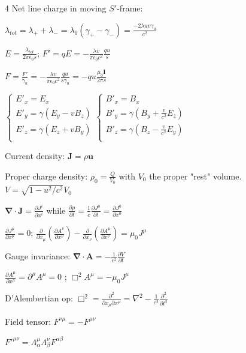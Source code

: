 \documentclass[a4paper,twoside]{article}
\begin{document}
\begin{multicols*}{4}
Net line charge in moving \(S'\)-frame:

\(\lambda_{tot} = \lambda_+ + \lambda_- = \lambda_0 (\gamma_+ - \gamma_-) = \frac{-2 \lambda uv\gamma_u}{c^2}\)

\(E = \frac{\lambda_{tot}}{2 \pi \epsilon_0 s}\);
\(F' = qE = - \frac{\lambda v}{\pi \epsilon_0 c^2} \frac{qu}{s}\)

\(F = \frac{F'}{\gamma_u} = - \frac{\lambda v}{\pi \epsilon_0 c^2} \frac{qu}{s \gamma_u} = -qu \frac{\mu_0 \bm I}{2 \pi s}\)



\(
\begin{cases}
    E'_x = E_x \\
    E'_y = \gamma (E_y - v B_z) \\
    E'_z = \gamma (E_z + v B_y) \\
\end{cases}
\begin{cases}
    B'_x = B_x \\
    B'_y = \gamma (B_y + \frac{v}{c^2} E_z) \\
    B'_z = \gamma (B_z - \frac{v}{c^2} E_y) \\
\end{cases}
\)

Current density:
\(\bm J = \rho \bm u\)

Proper charge density:
\(\rho_0 = \frac{Q}{V_0}\)
 with \(V_0\) the proper "rest" volume.
\(V = \sqrt{1 - u^2/c^2}V_0\)

\( \bm \nabla \cdot \bm J = \frac{\partial J^{i}}{\partial x^i} \) while \(\frac{\partial \rho}{\partial t} = \frac{1}{c} \frac{\partial J^0}{\partial t } = \frac{\partial J^0}{\partial x^0}\)

\(\frac{\partial J^\mu}{\partial x^\mu} = 0\);
\(\frac{\partial}{\partial x_\mu }(\frac{\partial A^\nu}{\partial x^\nu})-\frac{\partial}{\partial x_\nu }(\frac{\partial A^\mu}{\partial x^\nu}) = \mu_0 J^\mu\)

Gauge invariance:
\(\bm \nabla \cdot \bm A = -\frac{1}{c^2} \frac{\partial V}{\partial t}\)

\(\frac{\partial A^\mu}{\partial x^\mu} = \partial^\mu A^\mu = 0\) ; \(\Box^2 A^\mu = - \mu_0 J^\mu\)

D'Alembertian op:
\(\Box^2 = \frac{\partial^2}{\partial x_\mu \partial x^\mu} = \nabla^2 -\frac{1}{c^2} \frac{\partial^2}{\partial t^2} \)

Field tensor:
\(F^{\nu\mu} = - F^{\mu\nu}\)

\(F'^{\mu\nu} = \Lambda^\mu_\alpha \Lambda^\nu_\beta F^{\alpha\beta}\)


\end{multicols*}
\end{document}
